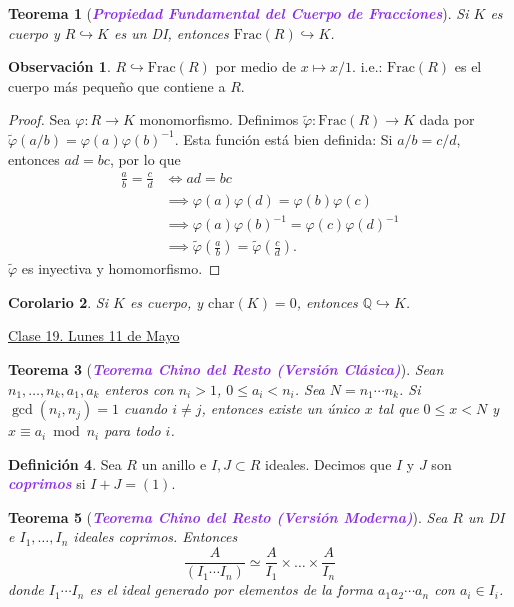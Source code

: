 \documentclass{article}
\newtheorem{theorem}{Teorema}[subsection]
\newtheorem{corollary}[theorem]{Corolario}
\theoremstyle{definition}
\newtheorem{definition}[theorem]{Definición}
\newtheorem*{obs}{Observación}
\theoremstyle{remark}
\numberwithin{equation}{section}
\newcommand{\Q}{\mathbb{Q}}
\newcommand{\vphi}{\varphi}
\newcommand{\embed}{\hookrightarrow}
\renewcommand{\tilde}{\widetilde}
\newcommand{\Char}{\mathrm{char}}
\newcommand{\Frac}{\mathrm{Frac}}
\newcommand{\br}[1]{\left( #1 \right)}
\newcommand{\wea}[1]{\textcolor{BlueViolet}{\textbf{\emph{#1}}}}
\newcommand{\fecha}[1]{\begin{flushright} \underline{#1} \end{flushright}}
\begin{document}
\begin{theorem}
  [\wea{Propiedad Fundamental del Cuerpo de Fracciones}] Si $K$ es cuerpo y $R \embed K$ es un DI, entonces $\Frac(R) \embed K$.
\end{theorem}

\begin{obs}
  $R \embed \Frac(R)$ por medio de $x \mapsto x/1$. i.e.: $\Frac(R)$ es el cuerpo más pequeño que contiene a $R$.
\end{obs}
\begin{proof}
  Sea $\vphi \colon R \to K$ monomorfismo. Definimos $\tilde\vphi \colon \Frac(R) \to K$ dada por $\tilde\vphi(a/b) = \vphi(a) \vphi(b)^{-1}$. Esta función está bien definida: Si $a/b = c/d$, entonces $ad = bc$, por lo que 
  \begin{align*}
      \frac{a}{b} = \frac{c}{d}
      &\iff ad = bc \\
      &\implies \vphi(a)\vphi(d) = \vphi(b) \vphi(c) \\
      &\implies \vphi(a)\vphi(b)^{-1} = \vphi(c)\vphi(d)^{-1} \\
      &\implies \tilde\vphi\br{\frac{a}{b}} = \tilde\vphi\br{\frac{c}{d}}.
  \end{align*}
  $\tilde\vphi$ es inyectiva y homomorfismo. %
\end{proof}

\begin{corollary}
  Si $K$ es cuerpo, y $\Char(K) = 0$, entonces $\Q \embed K$.
\end{corollary}

\fecha{Clase 19. Lunes 11 de Mayo}

\begin{theorem}
  [\wea{Teorema Chino del Resto (Versión Clásica)}]
  Sean $n_1,\dots, n_k,a_1,a_k$ enteros con $n_i > 1$, $0 \leq a_i < n_i$.
  Sea $N = n_1 \cdots n_k$. Si $\gcd(n_i,n_j) = 1$ cuando $i \neq j$, entonces existe un único $x$ tal que $0 \leq x < N$ y $x \equiv a_i \bmod n_i$ para todo $i$.
\end{theorem}

\begin{definition}
  Sea $R$ un anillo e $I,J \subset R$ ideales. Decimos que $I$ y $J$ son \wea{coprimos} si $I + J = (1)$.
\end{definition}

\begin{theorem}
  [\wea{Teorema Chino del Resto (Versión Moderna)}]
  Sea $R$ un DI e $I_1, \dots, I_n$ ideales coprimos. Entonces 
  \[ \frac{A}{(I_1 \cdots I_n)} \simeq \frac{A}{I_1} \times \dots \times \frac{A}{I_n} \]
  donde $I_1 \cdots I_n$ es el ideal generado por elementos de la forma $a_1a_2 \cdots a_n$ con $a_i \in I_i$.
\end{theorem}
\end{document}
